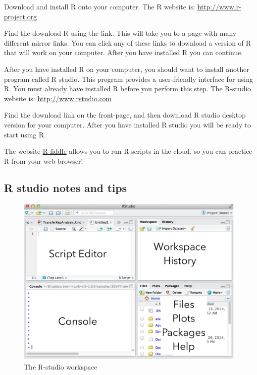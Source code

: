 \documentclass[
]{book}
\begin{document}
Download and install R onto your computer. The R website is: \url{http://www.r-project.org}

Find the download R using the link. This will take you to a page with many different mirror links. You can click any of these links to download a version of R that will work on your computer. After you have installed R you can continue.

After you have installed R on your computer, you should want to install another program called R studio. This program provides a user-friendly interface for using R. You must already have installed R before you perform this step. The R-studio website is: \url{http://www.rstudio.com}

Find the download link on the front-page, and then download R studio desktop version for your computer. After you have installed R studio you will be ready to start using R.

The website \href{http://www.r-fiddle.org}{R-fiddle} allows you to run R scripts in the cloud, so you can practice R from your web-browser!

\hypertarget{r-studio-notes-and-tips}{%
\subsection{R studio notes and tips}\label{r-studio-notes-and-tips}}

\begin{figure}
\centering
\includegraphics{figures/FigRstudio.pdf}
\caption{\label{fig:2rstudiod}The R-studio workspace}
\end{figure}
\end{document}
